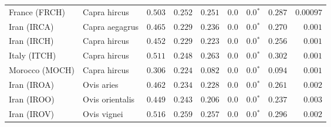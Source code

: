 \begin{center}
\begin{adjustbox}{width = 1\textwidth}
\begin{tabular}{|l|l|r|r|r|r|r|r|r|}
                  France (FRCH) &         Capra hircus &                                        $ 0.503$ &                                           $ 0.252$ &                      $ 0.251$ &            $0.0$ &                  $\bm{0.0{^*}}$ &                                           $ 0.287$ &          $0.00097$ \\
                    Iran (IRCA) &       Capra aegagrus &                                        $ 0.465$ &                                           $ 0.229$ &                      $ 0.236$ &            $0.0$ &                  $\bm{0.0{^*}}$ &                                           $ 0.270$ &           $ 0.001$ \\
                    Iran (IRCH) &         Capra hircus &                                        $ 0.452$ &                                           $ 0.229$ &                      $ 0.223$ &            $0.0$ &                  $\bm{0.0{^*}}$ &                                           $ 0.256$ &           $ 0.001$ \\
                   Italy (ITCH) &         Capra hircus &                                        $ 0.511$ &                                           $ 0.248$ &                      $ 0.263$ &            $0.0$ &                  $\bm{0.0{^*}}$ &                                           $ 0.302$ &           $ 0.001$ \\
                 Morocco (MOCH) &         Capra hircus &                                        $ 0.306$ &                                           $ 0.224$ &                      $ 0.082$ &            $0.0$ &                  $\bm{0.0{^*}}$ &                                           $ 0.094$ &           $ 0.001$ \\
                    Iran (IROA) &           Ovis aries &                                        $ 0.462$ &                                           $ 0.234$ &                      $ 0.228$ &            $0.0$ &                  $\bm{0.0{^*}}$ &                                           $ 0.261$ &           $ 0.002$ \\
                    Iran (IROO) &      Ovis orientalis &                                        $ 0.449$ &                                           $ 0.243$ &                      $ 0.206$ &            $0.0$ &                  $\bm{0.0{^*}}$ &                                           $ 0.237$ &           $ 0.003$ \\
                    Iran (IROV) &          Ovis vignei &                                        $ 0.516$ &                                           $ 0.259$ &                      $ 0.257$ &            $0.0$ &                  $\bm{0.0{^*}}$ &                                           $ 0.296$ &           $ 0.002$ \\

\end{tabular}
\end{adjustbox}
\end{center}

